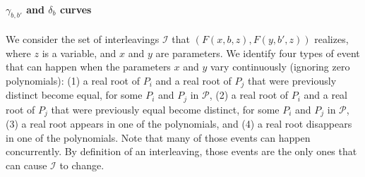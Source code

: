 \paragraph{$\gamma_{b,b'}$ and $\delta_{b}$ curves}
We consider the set of interleavings $\mathcal{I}$ that $(F(x,b,z),F(y,b',z))$
realizes, where $z$ is a variable, and $x$ and $y$ are parameters.
We identify four types of event that can happen when the parameters $x$ and $y$
vary continuously (ignoring zero polynomials):
(1) a real root of \(P_i\) and a real root of \(P_j\) that were previously
distinct become equal, for some \(P_i\) and \(P_j\) in \(\mathcal{P}\),
(2) a real root of \(P_i\) and a real root of \(P_j\) that were previously
equal become distinct, for some \(P_i\) and \(P_j\) in \(\mathcal{P}\),
(3) a real root appears in one of the polynomials,
and (4) a real root disappears in one of the polynomials.
Note that many of those events can happen concurrently.
By definition of an interleaving, those events are the only ones that can cause
$\mathcal{I}$ to change.

